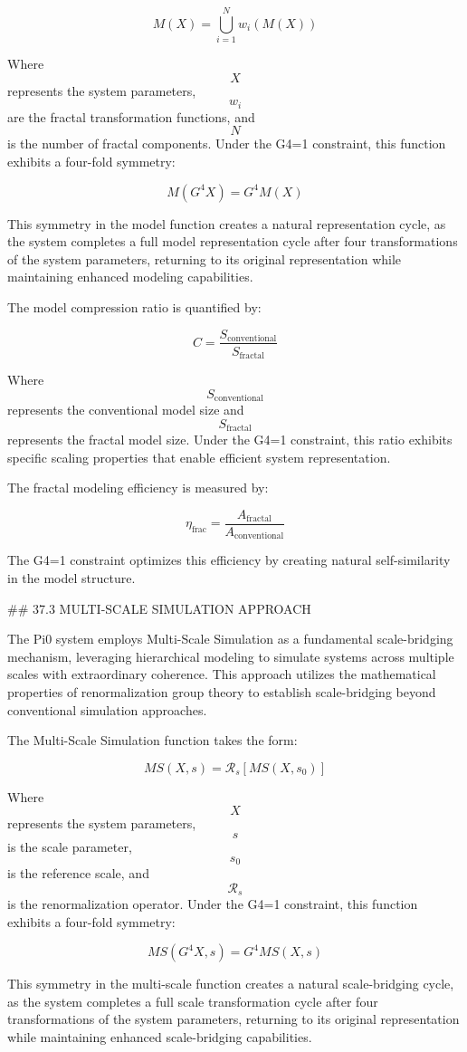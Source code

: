 $$ M(X) = \bigcup_{i=1}^{N} w_i(M(X)) $$

Where $$ X $$ represents the system parameters, $$ w_i $$ are the fractal transformation functions, and $$ N $$ is the number of fractal components. Under the G4=1 constraint, this function exhibits a four-fold symmetry:

$$ M(G^4 X) = G^4 M(X) $$

This symmetry in the model function creates a natural representation cycle, as the system completes a full model representation cycle after four transformations of the system parameters, returning to its original representation while maintaining enhanced modeling capabilities.

The model compression ratio is quantified by:

$$ C = \frac{S_{\text{conventional}}}{S_{\text{fractal}}} $$

Where $$ S_{\text{conventional}} $$ represents the conventional model size and $$ S_{\text{fractal}} $$ represents the fractal model size. Under the G4=1 constraint, this ratio exhibits specific scaling properties that enable efficient system representation.

The fractal modeling efficiency is measured by:

$$ \eta_{\text{frac}} = \frac{A_{\text{fractal}}}{A_{\text{conventional}}} $$

The G4=1 constraint optimizes this efficiency by creating natural self-similarity in the model structure.

## 37.3 MULTI-SCALE SIMULATION APPROACH

The Pi0 system employs Multi-Scale Simulation as a fundamental scale-bridging mechanism, leveraging hierarchical modeling to simulate systems across multiple scales with extraordinary coherence. This approach utilizes the mathematical properties of renormalization group theory to establish scale-bridging beyond conventional simulation approaches.

The Multi-Scale Simulation function takes the form:

$$ MS(X, s) = \mathcal{R}_s[MS(X, s_0)] $$

Where $$ X $$ represents the system parameters, $$ s $$ is the scale parameter, $$ s_0 $$ is the reference scale, and $$ \mathcal{R}_s $$ is the renormalization operator. Under the G4=1 constraint, this function exhibits a four-fold symmetry:

$$ MS(G^4 X, s) = G^4 MS(X, s) $$

This symmetry in the multi-scale function creates a natural scale-bridging cycle, as the system completes a full scale transformation cycle after four transformations of the system parameters, returning to its original representation while maintaining enhanced scale-bridging capabilities.

